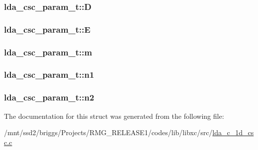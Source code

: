 \hypertarget{structlda__csc__param__t_acb1e42a751c6826b8ff293eba2ef4de2}{
\subsubsection[{D}]{ lda\-\_\-csc\-\_\-param\-\_\-t\-::\-D}}\label{structlda__csc__param__t_acb1e42a751c6826b8ff293eba2ef4de2}
\hypertarget{structlda__csc__param__t_aaad3c9ba51808ce7c311c18b8687ccc4}{
\subsubsection[{E}]{ lda\-\_\-csc\-\_\-param\-\_\-t\-::\-E}}\label{structlda__csc__param__t_aaad3c9ba51808ce7c311c18b8687ccc4}
\hypertarget{structlda__csc__param__t_ac87c960a9e6dd84ff206a3c1411b8866}{
\subsubsection[{m}]{ lda\-\_\-csc\-\_\-param\-\_\-t\-::m}}\label{structlda__csc__param__t_ac87c960a9e6dd84ff206a3c1411b8866}
\hypertarget{structlda__csc__param__t_a8510145d8bf17aaf33ef3011621a810f}{
\subsubsection[{n1}]{ lda\-\_\-csc\-\_\-param\-\_\-t\-::n1}}\label{structlda__csc__param__t_a8510145d8bf17aaf33ef3011621a810f}
\hypertarget{structlda__csc__param__t_a14e2e124e9f648dac6e9fe0f876025c3}{
\subsubsection[{n2}]{ lda\-\_\-csc\-\_\-param\-\_\-t\-::n2}}\label{structlda__csc__param__t_a14e2e124e9f648dac6e9fe0f876025c3}


The documentation for this struct was generated from the following file\-:\begin{DoxyCompactItemize}
\item 
/mnt/ssd2/briggs/\-Projects/\-R\-M\-G\-\_\-\-R\-E\-L\-E\-A\-S\-E1/codes/lib/libxc/src/\hyperlink{lda__c__1d__csc_8c}{lda\-\_\-c\-\_\-1d\-\_\-csc.\-c}\end{DoxyCompactItemize}
